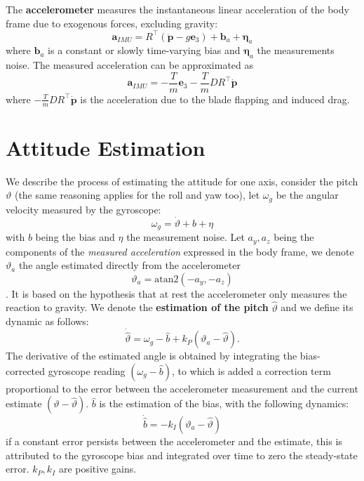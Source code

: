 \documentclass[10pt, a4paper]{report}
\begin{document}
\noindent The \textbf{accelerometer} measures the instantaneous linear acceleration of the body frame due to exogenous forces, excluding gravity:\begin{equation}
    \mathbf a_{IMU}=R^\top(\ddot{\mathbf p}-g\mathbf e_3)+\mathbf b_a+\boldsymbol{\eta}_a
\end{equation}
where $\mathbf b_a$ is a constant or slowly time-varying bias and $\boldsymbol{\eta}_a$ the measurements noise. The measured acceleration can be approximated as\begin{equation}
    \mathbf a_{IMU}=-\frac{T}{m}\mathbf e_3-\frac{T}{m}DR^\top\dot{\mathbf p}
\end{equation}
where $-\frac{T}{m}DR^\top\dot{\mathbf p}$ is the acceleration due to the blade flapping and induced drag.
\section{Attitude Estimation}
We describe the process of estimating the attitude for one axis, consider the pitch $\vartheta$ (the same reasoning applies for the roll and yaw too), let $\omega_g$ be the angular velocity measured by the gyroscope:\begin{equation}
    \omega_g=\dot\vartheta+b+\eta 
\end{equation}
with $b$ being the bias and $\eta$ the measurement noise. Let $a_y,a_z$ being the components of the \textit{measured acceleration} expressed in the body frame, we denote $\vartheta_a$ the angle estimated directly from the accelerometer\begin{equation}
    \vartheta_a=\text{atan2}(-a_y,-a_z)
\end{equation}.
It is based on the hypothesis that at rest the accelerometer only measures the reaction to gravity. We denote the \textbf{estimation of the pitch} $\hat\vartheta$ and we define its dynamic as follows:\begin{equation}
    \dot{\hat\vartheta}=\omega_g-\hat b+k_P(\vartheta_a-\hat\vartheta).
\end{equation}
The derivative of the estimated angle is obtained by integrating the bias-corrected gyroscope reading $(\omega_g - \hat{b})$, to which is added a correction term proportional to the error between the accelerometer measurement and the current estimate $(\vartheta - \hat{\vartheta})$.
$\hat b$ is the estimation of the bias, with the following dynamics:\begin{equation}
    \dot{\hat b}=-k_I(\vartheta_a-\hat\vartheta)
\end{equation}
if a constant error persists between the accelerometer and the estimate, this is attributed to the gyroscope bias and integrated over time to zero the steady-state error. $k_P,k_I$ are positive gains.
\end{document}
